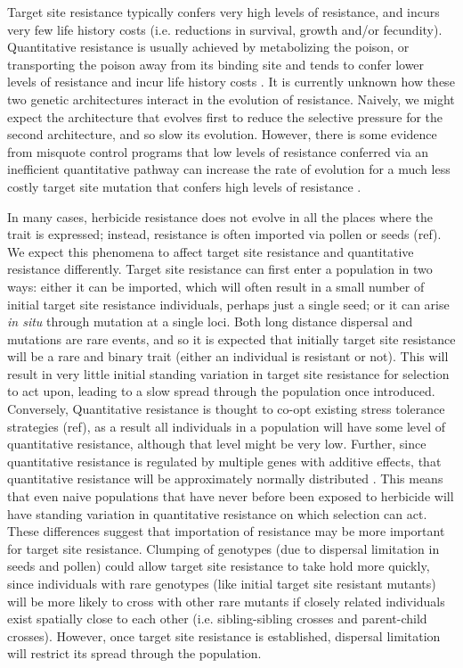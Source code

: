 \documentclass[10pt,letterpaper]{article}
\begin{document}
Target site resistance typically confers very high levels of resistance, and incurs very few life history costs (i.e. reductions in survival, growth and/or fecundity). Quantitative resistance is usually achieved by metabolizing the poison, or transporting the poison away from its binding site \cite{Bauc2016} and tends to confer lower levels of resistance and incur life history costs \cite{Bauc2016}. It is currently unknown how these two genetic architectures interact in the evolution of resistance. Naively, we might expect the architecture that evolves first to reduce the selective pressure for the second architecture, and so slow its evolution. However, there is some evidence from misquote control programs that low levels of resistance conferred via an inefficient quantitative pathway can increase the rate of evolution for a much less costly target site mutation that confers high levels of resistance \cite{Vera2015}.

In many cases, herbicide resistance does not evolve in all the places where the trait is expressed; instead, resistance is often imported via pollen or seeds (ref). We expect this phenomena to affect target site resistance and quantitative resistance differently. Target site resistance can first enter a population in two ways: either it can be imported, which will often result in a small number of initial target site resistance individuals, perhaps just a single seed; or it can arise \textit{in situ} through mutation at a single loci. Both long distance dispersal and mutations are rare events, and so it is expected that initially target site resistance will be a rare and binary trait (either an individual is resistant or not). This will result in very little initial standing variation in target site resistance for selection to act upon, leading to a slow spread through the population once introduced. Conversely, Quantitative resistance is thought to co-opt existing stress tolerance strategies (ref), as a result all individuals in a population will have some level of quantitative resistance, although that level might be very low. Further, since quantitative resistance is regulated by multiple genes with additive effects, that quantitative resistance will be approximately normally distributed \cite{Land1989, Mack2009, Rajo2013}. This means that even naive populations that have never before been exposed to herbicide will have standing variation in quantitative resistance on which selection can act. These differences suggest that importation of resistance may be more important for target site resistance. Clumping of genotypes (due to dispersal limitation in seeds and pollen) could allow target site resistance to take hold more quickly, since individuals with rare genotypes (like initial target site resistant mutants) will be more likely to cross with other rare mutants if closely related individuals exist spatially close to each other (i.e. sibling-sibling crosses and parent-child crosses). However, once target site resistance is established, dispersal limitation will restrict its spread through the population. 
\end{document}
